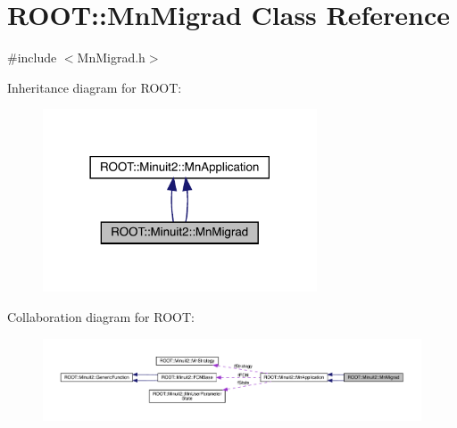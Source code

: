 \hypertarget{classROOT_1_1Minuit2_1_1MnMigrad}{}\section{R\+O\+OT\+:\+:Mn\+Migrad Class Reference}
\label{classROOT_1_1Minuit2_1_1MnMigrad}


{\ttfamily \#include $<$Mn\+Migrad.\+h$>$}



Inheritance diagram for R\+O\+OT\+:\nopagebreak
\begin{figure}[H]
\begin{center}
\leavevmode
\includegraphics[width=230pt]{d1/d4a/classROOT_1_1Minuit2_1_1MnMigrad__inherit__graph}
\end{center}
\end{figure}


Collaboration diagram for R\+O\+OT\+:\nopagebreak
\begin{figure}[H]
\begin{center}
\leavevmode
\includegraphics[width=350pt]{dc/d2b/classROOT_1_1Minuit2_1_1MnMigrad__coll__graph}
\end{center}
\end{figure}
